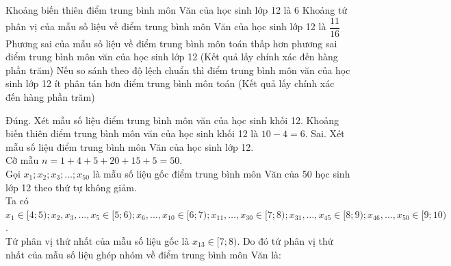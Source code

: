 \begin{ex}
\begin{center}
	\end{center}
	\choiceTF
	{\True Khoảng biến thiên điểm trung bình môn Văn của học sinh lớp 12 là $6$}
	{Khoảng tứ phân vị của mẫu số liệu về điểm trung bình môn Văn của học sinh lớp 12 là $\dfrac{11}{16}$}
	{\True Phương sai của mẫu số liệu về điểm trung bình môn toán thấp hơn phương sai điểm trung bình môn văn của học sinh lớp 12 (Kết quả lấy chính xác đến hàng phần trăm)}
	{Nếu so sánh theo độ lệch chuẩn thì điểm trung bình môn văn của học sinh lớp 12 ít phân tán hơn điểm trung bình môn toán (Kết quả lấy chính xác đến hàng phần trăm)}
	\loigiai
	{
		\begin{itemchoice}
			\itemch Đúng. Xét mẫu số liệu điểm trung bình môn văn của học sinh khối 12. Khoảng biến thiên điểm trung bình môn văn của học sinh khối 12 là $10-4=6$.
			\itemch Sai. Xét mẫu số liệu điểm trung bình môn Văn của học sinh lớp 12.\\
			Cỡ mẫu ${n}=1+4+5+20+15+5=50$.\\
			Gọi ${x}_{1} ; {x}_{2} ; {x}_{3} ; \ldots ; {x}_{50}$ là mẫu số liệu gốc điểm trung bình môn Văn của 50 học sinh lớp 12 theo thứ tự không giảm.\\
			Ta có
			${x}_{1} \in[4 ; 5) ; {x}_{2}, {x}_{3}, \ldots, {x}_{5} \in[5 ; 6) ; {x}_{6}, \ldots, {x}_{10} \in[6 ; 7) ; {x}_{11}, \ldots, {x}_{30} \in[7 ; 8) ; {x}_{31}, \ldots, {x}_{45} \in[8 ; 9) ; {x}_{46}, \ldots, {x}_{50} \in[9 ; 10)$.\\
			Tứ phân vị thứ nhất của mẫu số liệu gốc là $x_{13} \in[7 ; 8)$. Do đó tứ phân vị thứ nhất của mẫu số liệu ghép nhóm về điểm trung bình môn Văn là:

\end{itemchoice}}
\end{ex}
